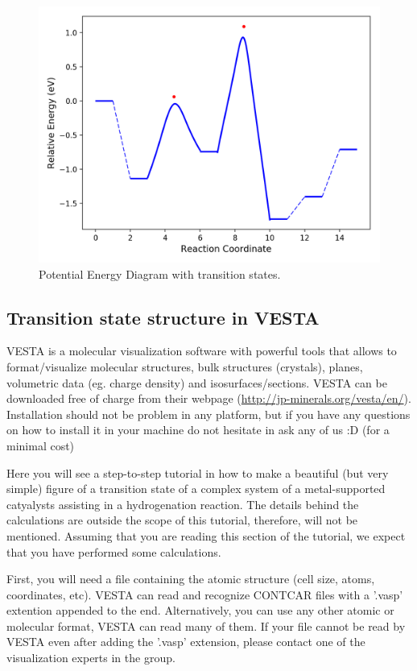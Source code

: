 \documentclass[11pt]{article}
\begin{document}
\begin{figure}[htbp]
\centering
\includegraphics[width=.9\linewidth]{./test.png}
\caption{Potential Energy Diagram with transition states.}
\end{figure}

\subsection{Transition state structure in VESTA}
\label{sec:orge4c5bc0}
VESTA is a molecular visualization software with powerful tools that allows to format/visualize molecular structures, bulk structures (crystals), planes, volumetric data (eg. charge density) and isosurfaces/sections. VESTA can be downloaded free of charge from their webpage (\url{http://jp-minerals.org/vesta/en/}). Installation should not be problem in any platform, but if you have any questions on how to install it in your machine do not hesitate in ask any of us :D (for a minimal cost)

Here you will see a step-to-step tutorial in how to make a beautiful (but very simple) figure of a transition state of a complex system of a metal-supported catyalysts assisting in a hydrogenation reaction. The details behind the calculations are outside the scope of this tutorial, therefore, will not be mentioned. Assuming that you are reading this section of the tutorial, we expect that you have performed some calculations.

First, you will need a file containing the atomic structure (cell size, atoms, coordinates, etc). VESTA can read and recognize CONTCAR files with a '.vasp' extention appended to the end. Alternatively, you can use any other atomic or molecular format, VESTA can read many of them. If your file cannot be read by VESTA even after adding the '.vasp' extension, please contact one of the visualization experts in the group.
\end{document}

